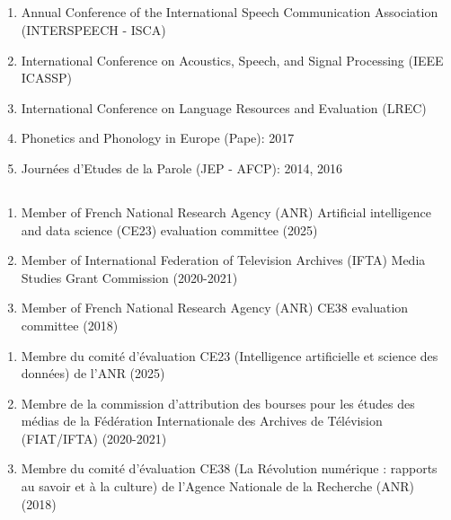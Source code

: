 \subsection{\EvalConf}
\begin{enumerate}[nosep,after=\strut, leftmargin=1em, itemsep=3pt]
\item Annual Conference of the International Speech Communication Association (INTERSPEECH - ISCA)
\item International Conference on Acoustics, Speech, and Signal Processing (IEEE ICASSP)
\item International Conference on Language Resources and Evaluation (LREC)
\item Phonetics and Phonology in Europe (Pape): 2017
\item Journées d’Etudes de la Parole (JEP - AFCP): 2014, 2016
\end{enumerate}
\subsection{\EvalProj}

\begin{en}
\begin{enumerate}[nosep,after=\strut, leftmargin=1em, itemsep=3pt]
\item Member of French National Research Agency (ANR) Artificial intelligence and data science (CE23) evaluation committee (2025)
\item Member of International Federation of Television Archives (IFTA) Media Studies Grant Commission (2020-2021)
\item Member of French National Research Agency (ANR) CE38 evaluation committee (2018)
\end{enumerate}
\end{en}

\begin{fr}
\begin{enumerate}[nosep,after=\strut, leftmargin=1em, itemsep=3pt]
\item Membre du comité d'évaluation CE23 (Intelligence artificielle et science des données) de l'ANR (2025)
\item Membre de la commission d'attribution des bourses pour les études des médias de la Fédération Internationale des Archives de Télévision (FIAT/IFTA) (2020-2021)
\item Membre du comité d'évaluation CE38 (La Révolution numérique : rapports au savoir et à la culture) de l'Agence Nationale de la Recherche (ANR) (2018)
\end{enumerate}
\end{fr}

